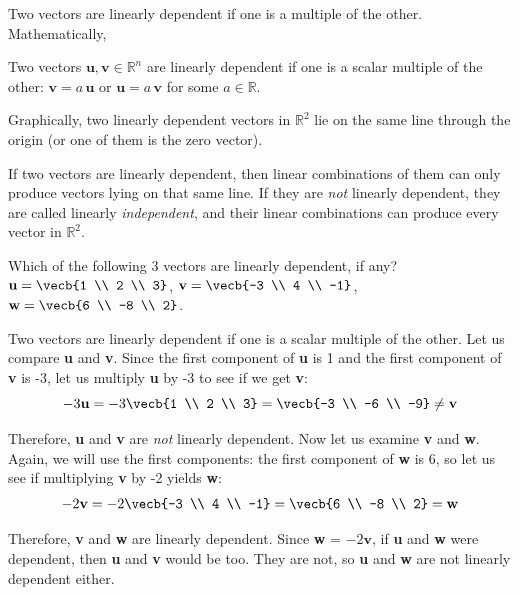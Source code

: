Two vectors are linearly dependent if one is a multiple of the other. 
Mathematically, 

\begin{mdframed}[style = important, frametitle = {Linearly dependent vectors in $\mathbb{R}^n$}]
Two vectors $\mathbf{u}, \mathbf{v} \in \mathbb{R}^n$ are linearly dependent if 
one is a scalar multiple of the other: $\mathbf{v} = a\,\mathbf{u}$ or
$\mathbf{u} = a\,\mathbf{v}$ for some $a \in \mathbb{R}$.
\end{mdframed}

Graphically, two linearly dependent vectors in $\mathbb{R}^2$ lie on the same 
line through the origin (or one of them is the zero vector).

If two vectors are linearly dependent, then linear combinations of them can 
only produce vectors lying on that same line. If they are \textit{not} linearly 
dependent, they are called linearly \emph{independent}, and their linear 
combinations can produce every vector in $\mathbb{R}^2$.


\begin{Worked}
\begin{Problem}
Which of the following 3 vectors are linearly dependent, if
any? 
$\textbf{u} = \vecb{1 \\ 2 \\ 3}$, $\textbf{v} = \vecb{-3 \\ 4 \\ -1}$, 
$\textbf{w} = \vecb{6 \\ -8 \\ 2}$.
\end{Problem}
\begin{Solution}
Two vectors are linearly dependent if one is a scalar
multiple of the other. Let us compare \textbf{u} and \textbf{v}. Since the 
first component of \textbf{u} is 1 and the first component of \textbf{v} is 
-3, let us multiply \textbf{u} by -3 to see if we get \textbf{v}:
$$-3 \textbf{u} = -3 \vecb{1 \\ 2 \\ 3} = \vecb{-3 \\ -6 \\ -9} \neq 
\textbf{v}$$

Therefore, \textbf{u} and \textbf{v} are \textit{not} linearly dependent. Now 
let us examine \textbf{v} and \textbf{w}. Again, we will use the first 
components: the first component of \textbf{w} is 6, so let us see if multiplying 
\textbf{v} by -2 yields \textbf{w}:
$$-2\textbf{v} = -2 \vecb{-3 \\ 4 \\ -1} = \vecb{6 \\ -8 \\ 2} = 
\textbf{w}$$

Therefore, \textbf{v} and \textbf{w} are linearly dependent. Since \textbf{w} = $-2\textbf{v}$, 
if \textbf{u} and \textbf{w} were dependent, then \textbf{u} and \textbf{v} would be too. 
They are not, so \textbf{u} and \textbf{w} are not linearly dependent either. 
\end{Solution}
\end{Worked}

